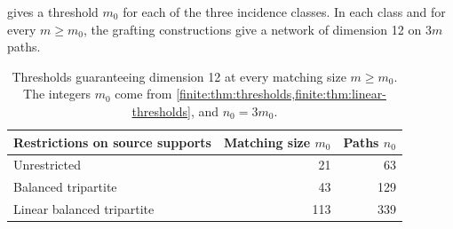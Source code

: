 \documentclass[10pt]{article}
\numberwithin{equation}{section}
\begin{document}
 gives a threshold $m_0$ for each of the three incidence classes. In each class and for every $m\ge m_0$, the grafting constructions give a network of dimension 12 on $3m$ paths.

\begin{table}[htbp]
\centering
\caption{Thresholds guaranteeing dimension 12 at every matching size $m\ge m_0$. The integers $m_0$ come from \cref{finite:thm:thresholds,finite:thm:linear-thresholds}, and $n_0=3m_0$.}\label{finite:tab:allorders}
\begin{tabular}{lrr}
\toprule
Restrictions on source supports & Matching size $m_0$ & Paths $n_0$\\
\midrule
Unrestricted & 21 & 63\\
Balanced tripartite & 43 & 129\\
Linear balanced tripartite & 113 & 339\\
\bottomrule
\end{tabular}
\end{table}
\end{document}
